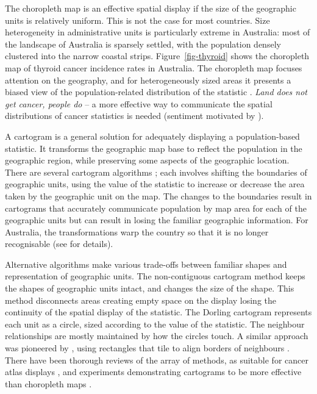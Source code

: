 \documentclass[
doublespace,
  times]{anzsauth}
\begin{document}
The choropleth map is an effective spatial display if the size of the
geographic units is relatively uniform. This is not the case for most
countries. Size heterogeneity in administrative units is particularly
extreme in Australia: most of the landscape of Australia is sparsely
settled, with the population densely clustered into the narrow coastal
strips. Figure~\ref{fig-thyroid} shows the choropleth map of thyroid
cancer incidence rates in Australia. The choropleth map focuses
attention on the geography, and for heterogeneously sized areas it
presents a biased view of the population-related distribution of the
statistic \citep{CBATCC}. \emph{Land does not get cancer, people do} --
a more effective way to communicate the spatial distributions of cancer
statistics is needed (sentiment motivated by \citet{monmonier2018how}).

A cartogram is a general solution for adequately displaying a
population-based statistic. It transforms the geographic map base to
reflect the population in the geographic region, while preserving some
aspects of the geographic location. There are several cartogram
algorithms \citep{ACTUC, CBATCC}; each involves shifting the boundaries
of geographic units, using the value of the statistic to increase or
decrease the area taken by the geographic unit on the map. The changes
to the boundaries result in cartograms that accurately communicate
population by map area for each of the geographic units but can result
in losing the familiar geographic information. For Australia, the
transformations warp the country so that it is no longer recognisable
(see \citet{KCR} for details).

Alternative algorithms make various trade-offs between familiar shapes
and representation of geographic units. The non-contiguous cartogram
method \citep{NAC} keeps the shapes of geographic units intact, and
changes the size of the shape. This method disconnects areas creating
empty space on the display losing the continuity of the spatial display
of the statistic. The Dorling cartogram \citep{ACTUC} represents each
unit as a circle, sized according to the value of the statistic. The
neighbour relationships are mostly maintained by how the circles touch.
A similar approach was pioneered by \citet{RSCW}, using rectangles that
tile to align borders of neighbours \citep{CDWCS}. There have been
thorough reviews of the array of methods, as suitable for cancer atlas
displays \citep[e.g.][]{KCR, BCM}, and experiments demonstrating
cartograms to be more effective than choropleth maps \citep{KFIF}.
\end{document}
